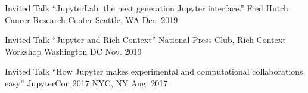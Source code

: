 
\begin{cvpresentations}


  \cvpresentation
    {Invited Talk}
    {``JupyterLab: the next generation Jupyter interface.''} %
    {Fred Hutch Cancer Research Center} %
    {Seattle, WA} %
    {Dec. 2019} %

  \cvpresentation
    {Invited Talk}
    {``Jupyter and Rich Context''} %
    {National Press Club, Rich Context Workshop} %
    {Washington DC} %
    {Nov. 2019} %


  \cvpresentation
    {Invited Talk}
    {``How Jupyter makes experimental and computational collaborations easy''} %
    {JupyterCon 2017} %
    {NYC, NY} %
    {Aug. 2017} %


\end{cvpresentations}
